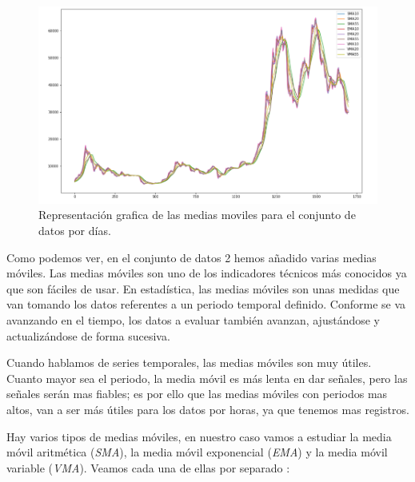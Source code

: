 \documentclass[11pt]{article} %
\begin{document}
\begin{center}
	\begin{figure}[htb]
		\centering
		\includegraphics[scale = 0.6]{mediasmoviles.png}
		\caption{Representación grafica de las medias moviles para el conjunto de datos por días.}
	\end{figure}
\end{center}


Como podemos ver, en el conjunto de datos 2 hemos añadido varias medias móviles. Las medias móviles son uno de los indicadores técnicos más conocidos ya que son fáciles de usar. En estadística, las medias móviles son unas medidas que van tomando los datos referentes a un periodo temporal definido. Conforme se va avanzando en el tiempo, los datos a evaluar también avanzan, ajustándose y actualizándose de forma sucesiva. 


Cuando hablamos de series temporales, las medias móviles son muy útiles. Cuanto mayor sea el periodo, la media móvil es más lenta en dar señales, pero las señales serán mas fiables; es por ello que las medias móviles con periodos mas altos, van a ser más útiles para los datos por horas, ya que tenemos mas registros.


Hay varios tipos de medias móviles, en nuestro caso vamos a estudiar la media móvil aritmética (\textit{SMA}), la media móvil exponencial (\textit{EMA}) y la media móvil variable (\textit{VMA}). Veamos cada una de ellas por separado \cite{mmovil}:
\end{document}
